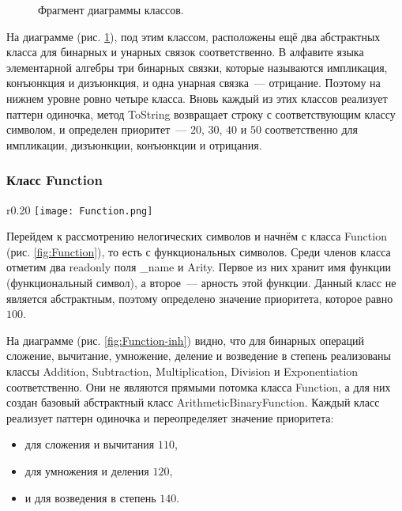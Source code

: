 \begin{figure}[h]
    \caption{Фрагмент диаграммы классов.}
    \label{fig:PropositionalConnective}
\end{figure}

На диаграмме (рис. \ref{fig:PropositionalConnective}), под этим классом, расположены ещё два абстрактных класса для бинарных и унарных связок соответственно. В алфавите языка элементарной алгебры три бинарных связки, которые называются импликация, конъюнкция и дизъюнкция, и одна унарная связка~--- отрицание. Поэтому на нижнем уровне ровно четыре класса. Вновь каждый из этих классов реализует паттерн одиночка, метод ToString возвращает строку с соответствующим классу символом, и определен приоритет~--- $20$, $30$, $40$ и $50$ соответственно для импликации, дизъюнкции, конъюнкции и отрицания.

\subsubsection{Класс Function}

\begin{wrapfigure}{r}{0.20\textwidth}
    \texttt{[image: Function.png]}
    \caption{}
    \label{fig:Function}
\end{wrapfigure}

Перейдем к рассмотрению нелогических символов и начнём с класса Function (рис. \ref{fig:Function}), то есть с функциональных символов. Среди членов класса отметим два readonly поля \_name и Arity. Первое из них хранит имя функции (функциональный символ), а второе~--- арность этой функции. Данный класс не является абстрактным, поэтому определено значение приоритета, которое равно $100$. 

На диаграмме (рис. \ref{fig:Function-inh}) видно, что для бинарных операций сложение, вычитание, умножение, деление и возведение в степень реализованы классы Addition, Subtraction, Multiplication, Division и Exponentiation соответственно. Они не являются прямыми потомка класса Function, а для них создан базовый абстрактный класс ArithmeticBinaryFunction. Каждый класс реализует паттерн одиночка и переопределяет значение приоритета:
\begin{itemize}
    \item для сложения и вычитания $110$,
    \item для умножения и деления $120$,
    \item и для возведения в степень $140$.
\end{itemize}

